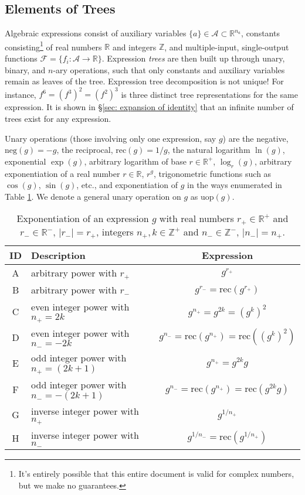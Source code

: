 \documentclass[10pt]{article}
\newcommand{\rec}{\mathrm{rec}}
\renewcommand{\neg}{\mathrm{neg}}
\newcommand{\uop}{\mathrm{uop}}
\begin{document}
\subsection{Elements of Trees} \label{sec: tree parts}
Algebraic expressions consist of auxiliary variables $\{a\}\in\mathcal{A}\subset\mathbb{R}^{n_a}$, constants consisting\footnote{It's entirely possible that this entire document is valid for complex numbers, but we make no guarantees.} of real numbers $\mathbb{R}$ and integers $\mathbb{Z}$, and multiple-input, single-output functions $\mathcal{F}=\{f_i\colon \mathcal{A}\to\mathbb{R}\}$.
Expression \emph{trees} are then built up through unary, binary, and $n$-ary operations, such that only constants and auxiliary variables remain as leaves of the tree.
Expression tree decomposition is not unique!
For instance, $f^6 = (f^3)^2 = (f^2)^3$ is three distinct tree representations for the same expression.
It is shown in \S\ref{sec: expansion of identity} that an infinite number of trees exist for any expression.

Unary operations (those involving only one expression, say $g$) are the negative, $\neg(g)=-g$, the reciprocal, $\rec(g)=1/g$, the natural logarithm $\ln(g)$, exponential $\exp(g)$, arbitrary logarithm of base $r\in\mathbb{R}^+$, $\log_r(g)$, arbitrary exponentiation of a real number $r\in\mathbb{R}$, $r^g$, trigonometric functions such as $\cos(g)$, $\sin(g)$, etc., and exponentiation of $g$ in the ways enumerated in Table \ref{tab: exponentiation options}.
We denote a general unary operation on $g$ as $\uop(g)$.
\begin{table}[h]
\caption{Exponentiation of an expression $g$ with real numbers $r_+\in\mathbb{R}^+$ and $r_-\in\mathbb{R}^-, \,|r_-|=r_+$, integers $n_+, k\in\mathbb{Z}^+$ and $n_-\in\mathbb{Z}^-, \,|n_-|=n_+$.}
\begin{center}
\begin{tabular}{c|l|c}
	ID & Description & Expression \\
	\hline
	A & arbitrary power with $r_+$ & $g^{r_+}$ \\
	B & arbitrary power with $r_-$ & $g^{r_-}=\rec(g^{r_+})$ \\
	C & even integer power with $n_+=2k$ & $g^{n_+}=g^{2k}=(g^k)^2$ \\
	D & even integer power with $n_-=-2k$ & $g^{n_-}=\rec(g^{n_+})=\rec((g^k)^2)$ \\
	E & odd integer power with $n_+=(2k+1)$ & $g^{n_+}=g^{2k}g$ \\
	F & odd integer power with $n_-=-(2k+1)$ & $g^{n_-}=\rec(g^{n_+})=\rec(g^{2k}g)$ \\
	G & inverse integer power with $n_+$ & $g^{1/n_+}$ \\
	H & inverse integer power with $n_-$ & $g^{1/n_-}=\rec(g^{1/n_+})$ \\
	\hline
\end{tabular}
\end{center}
\label{tab: exponentiation options}
\end{table}
\end{document}
